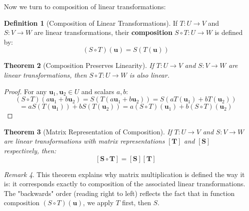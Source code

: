 \documentclass[12pt]{article}
\numberwithin{equation}{section}
\newcommand{\vect}[1]{\boldsymbol{#1}}   %
\newcommand{\mat}[1]{\mathbf{#1}}        %
\theoremstyle{plain}
\newtheorem{theorem}{Theorem}[section]
\theoremstyle{definition}
\newtheorem{definition}[theorem]{Definition}
\theoremstyle{remark}
\newtheorem{remark}[theorem]{Remark}
\begin{document}
Now we turn to composition of linear transformations:

\begin{definition}[Composition of Linear Transformations]
If $T: U \to V$ and $S: V \to W$ are linear transformations, their \textbf{composition} $S \circ T: U \to W$ is defined by:
$$(S \circ T)(\vect{u}) = S(T(\vect{u}))$$
\end{definition}

\begin{theorem}[Composition Preserves Linearity]
If $T: U \to V$ and $S: V \to W$ are linear transformations, then $S \circ T: U \to W$ is also linear.
\end{theorem}

\begin{proof}
For any $\vect{u}_1, \vect{u}_2 \in U$ and scalars $a, b$:
$$(S \circ T)(a\vect{u}_1 + b\vect{u}_2) = S(T(a\vect{u}_1 + b\vect{u}_2)) = S(aT(\vect{u}_1) + bT(\vect{u}_2))$$
$$= aS(T(\vect{u}_1)) + bS(T(\vect{u}_2)) = a(S \circ T)(\vect{u}_1) + b(S \circ T)(\vect{u}_2)$$
\end{proof}

\begin{theorem}[Matrix Representation of Composition]
If $T: U \to V$ and $S: V \to W$ are linear transformations with matrix representations $[\mat{T}]$ and $[\mat{S}]$ respectively, then:
$$[\mat{S \circ T}] = [\mat{S}][\mat{T}]$$
\end{theorem}

\begin{remark}
This theorem explains why matrix multiplication is defined the way it is: it corresponds exactly to composition of the associated linear transformations. The "backwards" order (reading right to left) reflects the fact that in function composition $(S \circ T)(\vect{u})$, we apply $T$ first, then $S$.
\end{remark}
\end{document}
